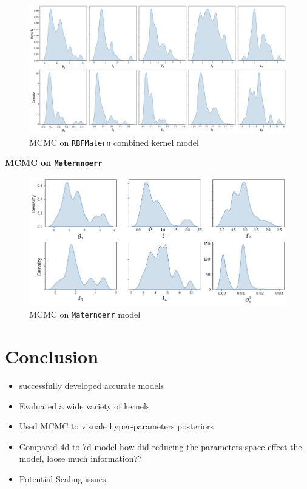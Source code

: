 \documentclass[10pt]{article}
\begin{document}
\begin{figure}[H]
    \centering
    \includegraphics[width=1\textwidth]{LatexPlots/final_gps_plots/MCMCRBFMat.png}
    \caption{MCMC on \texttt{RBFMatern} combined kernel model}
    \label{fig:MCMCRBFMatern}
\end{figure}



\textbf{MCMC on \texttt{Maternnoerr}}
\begin{figure}[H]
    \centering
    \includegraphics[width=1\textwidth]{LatexPlots/final_gps_plots/MCMCWhiteMat.png}
    \caption{MCMC on \texttt{Maternoerr} model}
    \label{fig:MCMCMaternnoerr}
\end{figure}


\section{Conclusion}
\begin{itemize}
    \item successfully developed accurate models
    \item Evaluated a wide variety of kernels
    \item Used MCMC to visuale hyper-parameters posteriors
    \item Compared 4d to 7d model how did reducing the parameters space effect the model, loose much information??
    \item Potential Scaling issues
\end{itemize}
\end{document}
